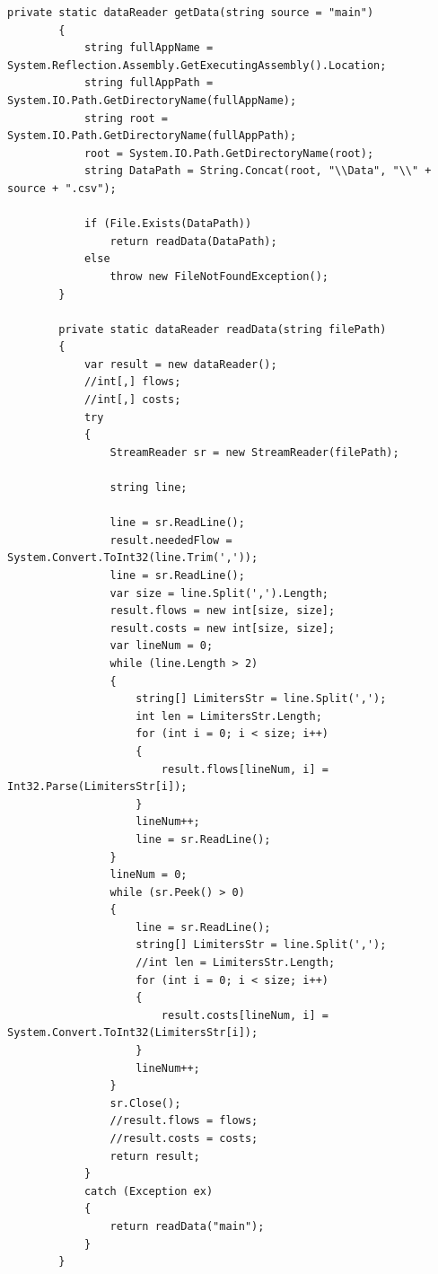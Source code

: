 \documentclass[a4paper,14pt,russian,ukrainian,oneside,final]{extreport}
\begin{document}
\begin{lstlisting}[style=csharpinlinestyle]
        private static dataReader getData(string source = "main")
        {
            string fullAppName = System.Reflection.Assembly.GetExecutingAssembly().Location;
            string fullAppPath = System.IO.Path.GetDirectoryName(fullAppName);
            string root = System.IO.Path.GetDirectoryName(fullAppPath);
            root = System.IO.Path.GetDirectoryName(root);
            string DataPath = String.Concat(root, "\\Data", "\\" + source + ".csv");

            if (File.Exists(DataPath))
                return readData(DataPath);
            else
                throw new FileNotFoundException();
        }

        private static dataReader readData(string filePath)
        {
            var result = new dataReader();
            //int[,] flows;
            //int[,] costs;
            try
            {
                StreamReader sr = new StreamReader(filePath);

                string line;

                line = sr.ReadLine();
                result.neededFlow = System.Convert.ToInt32(line.Trim(','));
                line = sr.ReadLine();
                var size = line.Split(',').Length;
                result.flows = new int[size, size];
                result.costs = new int[size, size];
                var lineNum = 0;
                while (line.Length > 2)
                {
                    string[] LimitersStr = line.Split(',');
                    int len = LimitersStr.Length;
                    for (int i = 0; i < size; i++)
                    {
                        result.flows[lineNum, i] = Int32.Parse(LimitersStr[i]);
                    }
                    lineNum++;
                    line = sr.ReadLine();
                }
                lineNum = 0;
                while (sr.Peek() > 0)
                {
                    line = sr.ReadLine();
                    string[] LimitersStr = line.Split(',');
                    //int len = LimitersStr.Length;
                    for (int i = 0; i < size; i++)
                    {
                        result.costs[lineNum, i] = System.Convert.ToInt32(LimitersStr[i]);
                    }
                    lineNum++;
                }
                sr.Close();
                //result.flows = flows;
                //result.costs = costs;
                return result;
            }
            catch (Exception ex)
            {
                return readData("main");
            }
        }


\end{lstlisting}
\end{document}
